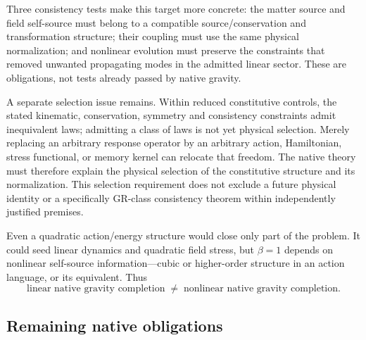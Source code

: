 \documentclass[11pt]{article}
\theoremstyle{plain}
\theoremstyle{remark}
\begin{document}
Three consistency tests make this target more concrete: the matter source
and field self-source must belong to a compatible source/conservation and
transformation structure; their coupling must use the same physical
normalization; and nonlinear evolution must preserve the constraints that
removed unwanted propagating modes in the admitted linear sector.
These are obligations, not tests already passed by native gravity.

A separate selection issue remains.  Within reduced constitutive controls,
the stated kinematic, conservation, symmetry and consistency constraints
admit inequivalent laws; admitting a class of laws is not yet physical selection.
Merely replacing an arbitrary response operator by an arbitrary action,
Hamiltonian, stress functional, or memory kernel can relocate that freedom.
The native theory must therefore explain the physical selection of the
constitutive structure and its normalization.  This selection requirement does not
exclude a future physical identity or a specifically GR-class
consistency theorem within independently justified premises.

Even a quadratic action/energy structure would close only part of the problem.  It could seed
linear dynamics and quadratic field stress, but $\beta=1$ depends on nonlinear self-source
information---cubic or higher-order structure in an action language, or its equivalent.  Thus
\begin{equation}
\boxed{
\text{linear native gravity completion}
\;\neq\;
\text{nonlinear native gravity completion}.}
\end{equation}

\subsection{Remaining native obligations}
\end{document}
